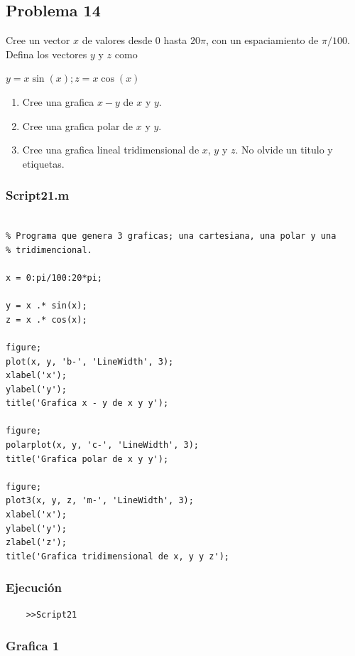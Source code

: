 \documentclass{article}
\begin{document}
	\newpage
	
	\subsection{Problema 14}
	
	Cree un vector $x$ de valores desde $0$ hasta $20\pi$, con un espaciamiento de $\pi/100$. Defina los vectores $y$ y $z$ como
	
	$y = x \sin(x); z = x \cos(x)$
	
	\begin{enumerate}
		\item Cree una grafica $x - y$ de $x$ y $y$.
		\item Cree una grafica polar de $x$ y $y$.
		\item Cree una grafica lineal tridimensional de $x$, $y$ y $z$. No olvide un titulo y etiquetas.
	\end{enumerate}
	
	\subsubsection{Script21.m}
	
	\begin{lstlisting}

% Programa que genera 3 graficas; una cartesiana, una polar y una
% tridimencional.

x = 0:pi/100:20*pi;

y = x .* sin(x);
z = x .* cos(x);

figure;
plot(x, y, 'b-', 'LineWidth', 3);
xlabel('x');
ylabel('y');
title('Grafica x - y de x y y');

figure;
polarplot(x, y, 'c-', 'LineWidth', 3);
title('Grafica polar de x y y');

figure;
plot3(x, y, z, 'm-', 'LineWidth', 3);
xlabel('x');
ylabel('y');
zlabel('z');
title('Grafica tridimensional de x, y y z');

	\end{lstlisting}
	
	\subsubsection{Ejecución}
	
	\begin{lstlisting}
	>>Script21
	\end{lstlisting}
	
	\newpage
	
	\subsubsection{Grafica 1}
	
\end{document}
